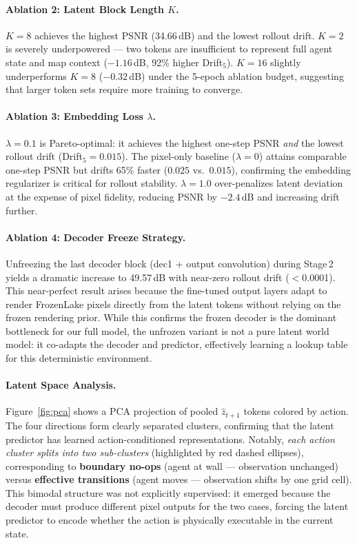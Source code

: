 \documentclass[11pt]{article}
\begin{document}
\paragraph{Ablation 2: Latent Block Length $K$.}
$K=8$ achieves the highest PSNR (34.66\,dB) and the lowest rollout drift.
$K=2$ is severely underpowered --- two tokens are insufficient to represent
full agent state and map context ($-1.16$\,dB, 92\% higher Drift$_5$).
$K=16$ slightly underperforms $K=8$ ($-0.32$\,dB) under the 5-epoch ablation budget,
suggesting that larger token sets require more training to converge.

\paragraph{Ablation 3: Embedding Loss $\lambda$.}
$\lambda=0.1$ is Pareto-optimal: it achieves the highest one-step PSNR \emph{and}
the lowest rollout drift (Drift$_5 = 0.015$).
The pixel-only baseline ($\lambda=0$) attains comparable one-step PSNR but drifts
65\% faster ($0.025$ vs.\ $0.015$), confirming the embedding regularizer is
critical for rollout stability.
$\lambda=1.0$ over-penalizes latent deviation at the expense of pixel fidelity,
reducing PSNR by $-2.4$\,dB and increasing drift further.

\paragraph{Ablation 4: Decoder Freeze Strategy.}
Unfreezing the last decoder block (dec1 + output convolution) during Stage\,2
yields a dramatic increase to 49.57\,dB with near-zero rollout drift ($<$0.0001).
This near-perfect result arises because the fine-tuned output layers adapt to
render FrozenLake pixels directly from the latent tokens without relying on the
frozen rendering prior.
While this confirms the frozen decoder is the dominant bottleneck for our
full model, the unfrozen variant is not a pure latent world model: it co-adapts
the decoder and predictor, effectively learning a lookup table for this
deterministic environment.

\paragraph{Latent Space Analysis.}
Figure~\ref{fig:pca} shows a PCA projection of pooled $\hat{z}_{t+1}$ tokens colored by action.
The four directions form clearly separated clusters, confirming that the latent predictor
has learned action-conditioned representations.
Notably, \emph{each action cluster splits into two sub-clusters} (highlighted by red dashed
ellipses), corresponding to \textbf{boundary no-ops} (agent at wall — observation unchanged)
versus \textbf{effective transitions} (agent moves — observation shifts by one grid cell).
This bimodal structure was not explicitly supervised: it emerged because the decoder must
produce different pixel outputs for the two cases, forcing the latent predictor to encode
whether the action is physically executable in the current state.
\end{document}
